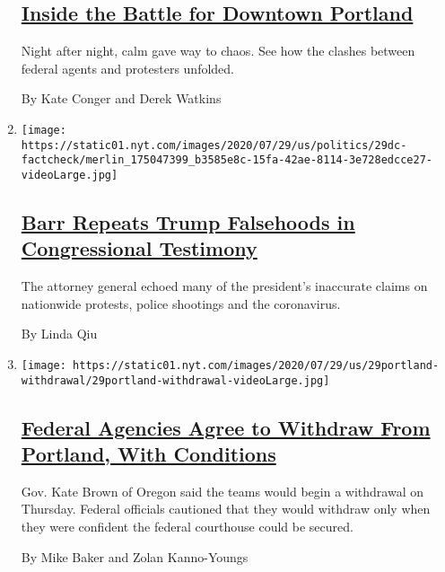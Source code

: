 \begin{enumerate}
  \hypertarget{inside-the-battle-for-downtown-portland}{%
  \subsection{\texorpdfstring{\href{/interactive/2020/07/31/us/portland-protests-map-photos.html}{Inside
  the Battle for Downtown
  Portland}}{Inside the Battle for Downtown Portland}}\label{inside-the-battle-for-downtown-portland}}

  Night after night, calm gave way to chaos. See how the clashes between
  federal agents and protesters unfolded.

  By Kate Conger and Derek Watkins
\item
  \texttt{[image: https://static01.nyt.com/images/2020/07/29/us/politics/29dc-factcheck/merlin\_175047399\_b3585e8c-15fa-42ae-8114-3e728edcce27-videoLarge.jpg]}

  \hypertarget{barr-repeats-trump-falsehoods-in-congressional-testimony}{%
  \subsection{\texorpdfstring{\href{/2020/07/29/us/politics/barr-trump-factcheck-congressional-testimony.html}{Barr
  Repeats Trump Falsehoods in Congressional
  Testimony}}{Barr Repeats Trump Falsehoods in Congressional Testimony}}\label{barr-repeats-trump-falsehoods-in-congressional-testimony}}

  The attorney general echoed many of the president's inaccurate claims
  on nationwide protests, police shootings and the coronavirus.

  By Linda Qiu
\item
  \texttt{[image: https://static01.nyt.com/images/2020/07/29/us/29portland-withdrawal/29portland-withdrawal-videoLarge.jpg]}

  \hypertarget{federal-agencies-agree-to-withdraw-from-portland-with-conditions}{%
  \subsection{\texorpdfstring{\href{/2020/07/29/us/protests-portland-federal-withdrawal.html}{Federal
  Agencies Agree to Withdraw From Portland, With
  Conditions}}{Federal Agencies Agree to Withdraw From Portland, With Conditions}}\label{federal-agencies-agree-to-withdraw-from-portland-with-conditions}}

  Gov. Kate Brown of Oregon said the teams would begin a withdrawal on
  Thursday. Federal officials cautioned that they would withdraw only
  when they were confident the federal courthouse could be secured.

  By Mike Baker and Zolan Kanno-Youngs
\end{enumerate}

